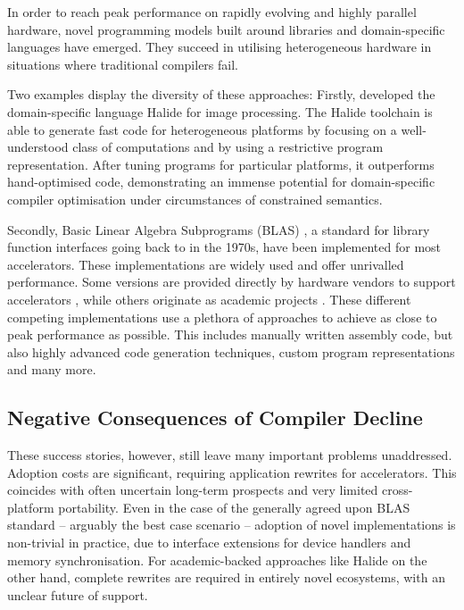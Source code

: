     In order to reach peak performance on rapidly evolving and highly parallel
    hardware, novel programming models built around libraries and
    domain-specific languages have emerged.
    They succeed in utilising heterogeneous hardware in situations where
    traditional compilers fail.

    Two examples display the diversity of these approaches:
    Firstly, \citet{Ragan-Kelley2013Halide} developed the domain-specific
    language Halide for image processing.
    The Halide toolchain is able to generate fast code for heterogeneous
    platforms by focusing on a well-understood class of computations and by
    using a restrictive program representation.
    After tuning programs for particular platforms, it outperforms
    hand-optimised code, demonstrating an immense potential for domain-specific
    compiler optimisation under circumstances of constrained semantics.

    Secondly, Basic Linear Algebra Subprograms (BLAS)
    \citep{2002:USB:567806.567807}, a standard for library function interfaces
    going back to \citet{Lawson:1979:BLA:355841.355847} in the 1970s, have been
    implemented for most accelerators.
    These implementations are widely used and offer unrivalled performance.
    Some versions are provided directly by hardware vendors to support
    accelerators \citep{mkl,cublas,clblas,apl,qml}, while others originate as
    academic projects \citep{Wang:2013:AAG:2503210.2503219}.
    These different competing implementations use a plethora of approaches to achieve as
    close to peak performance as possible.
    This includes manually written assembly code, but also highly advanced
    code generation techniques, custom program representations and many more.

\subsection{Negative Consequences of Compiler Decline}

    These success stories, however, still leave many important problems
    unaddressed.
    Adoption costs are significant, requiring application rewrites for
    accelerators.
    This coincides with often uncertain long-term prospects and very limited
    cross-platform portability.
    Even in the case of the generally agreed upon BLAS standard -- arguably the
    best case scenario -- adoption of novel implementations is non-trivial in
    practice, due to interface extensions for device handlers and memory
    synchronisation.
    For academic-backed approaches like Halide on the other hand, complete
    rewrites are required in entirely novel ecosystems, with an unclear future
    of support.

